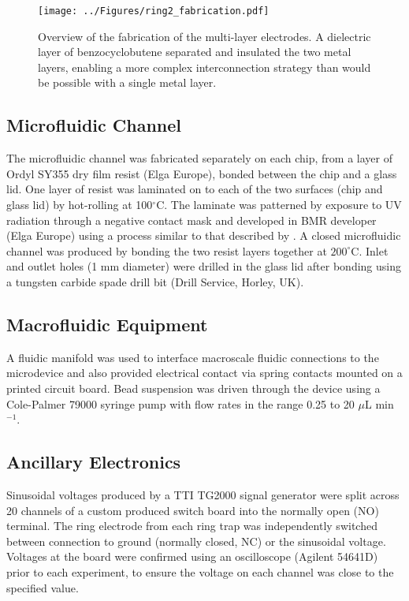 \begin{figure}
	\centering
		\texttt{[image: ../Figures/ring2\_fabrication.pdf]}
	\caption[Overview of the fabrication of multi-layer electrodes.]{Overview of the fabrication of the multi-layer electrodes. A dielectric layer of benzocyclobutene separated and insulated the two metal layers, enabling a more complex interconnection strategy than would be possible with a single metal layer.}
	\label{fig:ring2_fabrication}
\end{figure}

\subsection{Microfluidic Channel}
The microfluidic channel was fabricated separately on each chip, from a layer of Ordyl SY355 dry film resist (Elga Europe), bonded between the chip and a glass lid.  One layer of resist was laminated on to each of the two surfaces (chip and glass lid) by hot-rolling at 100$^{\circ}$C. The laminate was patterned by exposure to UV radiation through a negative contact mask and developed in BMR developer (Elga Europe) using a process similar to that described by \cite{Vulto:2005}. A closed microfluidic channel was produced by bonding the two resist layers together at $200^{\circ}$C. Inlet and outlet holes (1 mm diameter) were drilled in the glass lid after bonding using a tungsten carbide spade drill bit (Drill Service, Horley, UK).

\subsection{Macrofluidic Equipment}
A fluidic manifold was used to interface macroscale fluidic connections to the microdevice and also provided electrical contact via spring contacts mounted on a printed circuit board. Bead suspension was driven through the device using a Cole-Palmer 79000 syringe pump with flow rates in the range 0.25 to 20 $\mu$L min$^{-1}$. 

\subsection{Ancillary Electronics}
Sinusoidal voltages produced by a TTI TG2000 signal generator were split across 20 channels of a custom produced switch board into the normally open (NO) terminal. The ring electrode from each ring trap was independently switched between connection to ground (normally closed, NC) or the sinusoidal voltage. Voltages at the board were confirmed using an oscilloscope (Agilent 54641D) prior to each experiment, to ensure the voltage on each channel was close to the specified value. %

